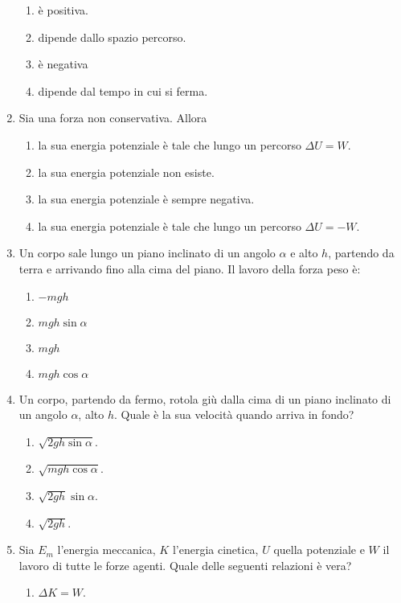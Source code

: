 \documentclass{article}
\begin{document}
\begin{enumerate}
  \begin{enumerate}[label=\Alph*.]
    \item è positiva.
    \item dipende dallo spazio percorso.
    \item è negativa
    \item dipende dal tempo in cui si ferma.
  \end{enumerate}
  \item Sia  una forza non conservativa. Allora
  \begin{enumerate}[label=\Alph*.]
    \item la sua energia potenziale è tale che lungo un percorso $\Delta U=W$.
    \item la sua energia potenziale non esiste.
    \item la sua energia potenziale è sempre negativa.
    \item la sua energia potenziale è tale che lungo un percorso $\Delta U=-W$.
  \end{enumerate}
  \item Un corpo sale lungo un piano inclinato di un angolo $\alpha$ e alto $h$, partendo da terra e arrivando fino alla cima del piano. Il lavoro della forza peso è:
  \begin{enumerate}[label=\Alph*.]
    \item $-mgh$
    \item $mgh\sin\alpha$
    \item $mgh$
    \item $mgh\cos\alpha$
  \end{enumerate}
  \item Un corpo, partendo da fermo, rotola giù dalla cima di un piano inclinato di un angolo $\alpha$, alto $h$. Quale è la sua velocità quando arriva in fondo?
  \begin{enumerate}[label=\Alph*.]
    \item $\sqrt{2gh\sin\alpha}$.
    \item $\sqrt{mgh\cos\alpha}$.
    \item $\sqrt{2gh}\sin\alpha$.
    \item $\sqrt{2gh}$.
  \end{enumerate}
  \item Sia $E_m$ l'energia meccanica, $K$ l'energia cinetica, $U$ quella potenziale e $W$ il lavoro di tutte le forze agenti. Quale delle seguenti relazioni è vera?
  \begin{enumerate}[label=\Alph*.]
    \item $\Delta K=W.$

\end{enumerate}
\end{enumerate}
\end{document}
